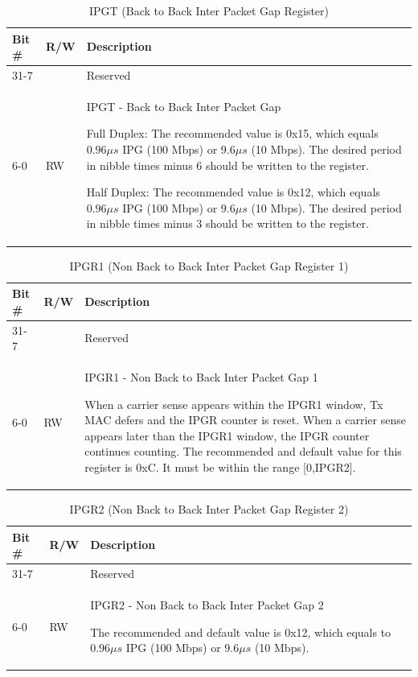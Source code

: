 \begin{xltabular}{\textwidth}{|l|l|X|}
  
  \hline
  {\bf Bit \#} & {\bf R/W} & {\bf Description} \\ \hline \hline
  \endfirsthead
  \hline
  \caption{IPGT (Back to Back Inter Packet Gap Register)}
  \endlastfoot

  31-7   &   & Reserved \\* \nobreakhline
  6-0      & RW & IPGT - Back to Back Inter Packet Gap

              Full Duplex: The recommended value is 0x15, which equals
              $0.96\mu s$ IPG (100 Mbps) or $9.6\mu s$ (10 Mbps). The desired
              period in nibble times minus 6 should be written to the
              register.

              Half Duplex: The recommended value is 0x12, which equals
              $0.96\mu s$ IPG (100 Mbps) or $9.6\mu s$ (10 Mbps). The desired
              period in nibble times minus 3 should be written to the
              register. \\
\end{xltabular}
\label{csr_details:ipgt}

\begin{xltabular}{\textwidth}{|l|l|X|}
  
  \hline
  {\bf Bit \#} & {\bf R/W} & {\bf Description} \\ \hline \hline
  \endfirsthead
  \hline
  \caption{IPGR1 (Non Back to Back Inter Packet Gap Register 1)}
  \endlastfoot

  31-7   &   & Reserved \\* \nobreakhline
  6-0      & RW & IPGR1 - Non Back to Back Inter Packet Gap 1

              When a carrier sense appears within the IPGR1 window, Tx MAC
              defers and the IPGR counter is reset. When a carrier sense
              appears later than the IPGR1 window, the IPGR counter continues
              counting. The recommended and default value for this register
              is 0xC. It must be within the range [0,IPGR2]. \\
\end{xltabular}
\label{csr_details:ipgr1}

\begin{xltabular}{\textwidth}{|l|l|X|}
  
  \hline
  {\bf Bit \#} & {\bf R/W} & {\bf Description} \\ \hline \hline
  \endfirsthead
  \hline
  \caption{IPGR2 (Non Back to Back Inter Packet Gap Register 2)}
  \endlastfoot

  31-7   &   & Reserved \\* \nobreakhline
  6-0      & RW & IPGR2 - Non Back to Back Inter Packet Gap 2

              The recommended and default value is 0x12, which equals to $0.96
              \mu s$ IPG (100 Mbps) or $9.6 \mu s$ (10 Mbps).\\
\end{xltabular}
\label{csr_details:ipgr2}

